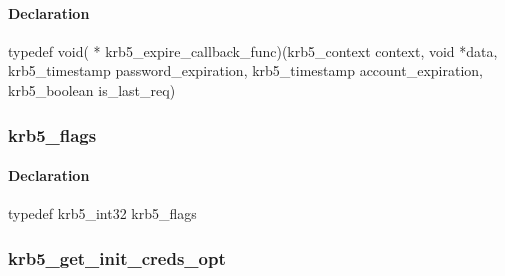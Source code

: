 \documentclass[letterpaper,10pt,english]{sphinxmanual}
\begin{document}
\begin{fulllineitems}
\label{appdev/refs/types/krb5_expire_callback_func:c.krb5_expire_callback_func}
\end{fulllineitems}



\paragraph{Declaration}
\label{appdev/refs/types/krb5_expire_callback_func:declaration}
typedef void( * krb5\_expire\_callback\_func)(krb5\_context context, void *data, krb5\_timestamp password\_expiration, krb5\_timestamp account\_expiration, krb5\_boolean is\_last\_req)


\subsubsection{krb5\_flags}
\label{appdev/refs/types/krb5_flags:krb5-flags-struct}\label{appdev/refs/types/krb5_flags:krb5-flags}\label{appdev/refs/types/krb5_flags::doc}

\begin{fulllineitems}
\label{appdev/refs/types/krb5_flags:c.krb5_flags}
\end{fulllineitems}



\paragraph{Declaration}
\label{appdev/refs/types/krb5_flags:declaration}
typedef krb5\_int32 krb5\_flags


\subsubsection{krb5\_get\_init\_creds\_opt}
\label{appdev/refs/types/krb5_get_init_creds_opt:krb5-get-init-creds-opt-struct}\label{appdev/refs/types/krb5_get_init_creds_opt::doc}\label{appdev/refs/types/krb5_get_init_creds_opt:krb5-get-init-creds-opt}

\begin{fulllineitems}
\label{appdev/refs/types/krb5_get_init_creds_opt:c.krb5_get_init_creds_opt}
\end{fulllineitems}
\end{document}
